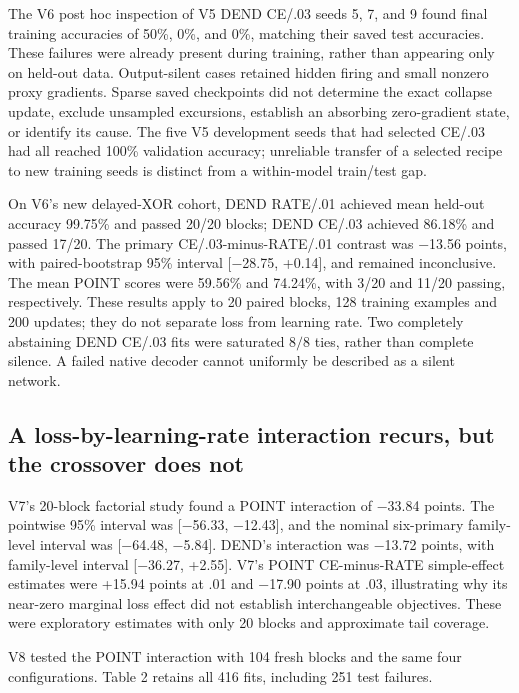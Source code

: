 \documentclass[
  10pt,
]{article}
\begin{document}
The V6 post hoc inspection of V5 DEND CE/.03 seeds 5, 7, and 9 found
final training accuracies of 50\%, 0\%, and 0\%, matching their saved
test accuracies. These failures were already present during training,
rather than appearing only on held-out data. Output-silent cases
retained hidden firing and small nonzero proxy gradients. Sparse saved
checkpoints did not determine the exact collapse update, exclude
unsampled excursions, establish an absorbing zero-gradient state, or
identify its cause. The five V5 development seeds that had selected
CE/.03 had all reached 100\% validation accuracy; unreliable transfer of
a selected recipe to new training seeds is distinct from a within-model
train/test gap.

On V6's new delayed-XOR cohort, DEND RATE/.01 achieved mean held-out
accuracy 99.75\% and passed 20/20 blocks; DEND CE/.03 achieved 86.18\%
and passed 17/20. The primary CE/.03-minus-RATE/.01 contrast was −13.56
points, with paired-bootstrap 95\% interval {[}−28.75, +0.14{]}, and
remained inconclusive. The mean POINT scores were 59.56\% and 74.24\%,
with 3/20 and 11/20 passing, respectively. These results apply to 20
paired blocks, 128 training examples and 200 updates; they do not
separate loss from learning rate. Two completely abstaining DEND CE/.03
fits were saturated \(8/8\) ties, rather than complete silence. A failed
native decoder cannot uniformly be described as a silent network.

\subsection{A loss-by-learning-rate interaction recurs, but the
crossover does
not}\label{a-loss-by-learning-rate-interaction-recurs-but-the-crossover-does-not}

V7's 20-block factorial study found a POINT interaction of −33.84
points. The pointwise 95\% interval was {[}−56.33, −12.43{]}, and the
nominal six-primary family-level interval was {[}−64.48, −5.84{]}.
DEND's interaction was −13.72 points, with family-level interval
{[}−36.27, +2.55{]}. V7's POINT CE-minus-RATE simple-effect estimates
were +15.94 points at .01 and −17.90 points at .03, illustrating why its
near-zero marginal loss effect did not establish interchangeable
objectives. These were exploratory estimates with only 20 blocks and
approximate tail coverage.

V8 tested the POINT interaction with 104 fresh blocks and the same four
configurations. Table 2 retains all 416 fits, including 251 test
failures.
\end{document}
